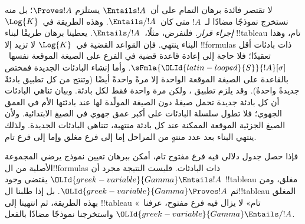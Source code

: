 \documentclass[../../../include/open-logic-section]{subfiles}
\begin{document}
      

\begin{explain}
  لا تقتصر فائدة برهان التمام على أن~$\Entails !A$ يستلزم
  $\Proves !A$؛ بل منه نستخرج نموذجًا مضادًا لـ~$!A$
  متى كان~$\Entails/ !A$. وهذه الطريقة في~$\Log{K}$ \emph{إجراء قرار}.
  فلنفرض، مثلًا،~$\Entails/ !A$. يعطينا برهان
   طريقًا لبناء !!{tableau} تام،
  وهذا البناء ينتهي. فإن القواعد القضية في~$\Log{K}$ لا تزيد إلا
  !!{formula}s ذات بادئات أقل تعقيدًا؛ فلا حاجة إلى إعادة قاعدة
  قضية في الفرع على الصيغة الموقعة نفسها~$\sFmla{\OLId{latin-looped}{S}}{!A}[\sigma]$.
  وأما إنشاء البادئات الجديدة فمختص بالقاعدة
  على الصيغة الموقعة الواحدة إلا مرةً واحدةً أيضًا (وتنتج من كل تطبيق
  بادئةٌ جديدةٌ واحدةٌ).
  وقد يلزم تطبيق
  ، ولكن مرة واحدة
  فقط لكل بادئة. وبيان تناهي البادئات أن كل بادئة جديدة تحمل صيغةً دون
  الصيغة المولّدة لها عند بادئتها الأم في العمق الجهوي؛ فلا تطول سلسلة
  البادئات على أكبر عمق جهوي في الصيغ الابتدائية. ولأن الصيغ الجزئية
  الموقعة الممكنة عند كل بادئة منتهية، تتناهى البادئات الجديدة. ولذلك
  ينتهي البناء بعد عدد منتهٍ من المراحل إما إلى فرع مغلق وإما إلى فرع تام.

  فإذا حصل جدول دلالي فيه فرع مفتوح تام، أمكن ببرهان
   تعيين نموذج يرضي المجموعة
  الأصلية من ال!!{formula}s ذات البادئات. فليست النتيجة مجرد أن
  $\OLId{greek-variable}{Gamma} \Entails !A$ يقتضي وجود !!{tableau} مغلق، ومن ثم
  $\OLId{greek-variable}{Gamma} \Proves !A$. بل إذا طلبنا ال!!{tableau} المغلق بهذه
  الطريقة، ثم انتهينا إلى !!{tableau} «تام» لا يزال فيه فرع مفتوح،
  عرفنا~$\OLId{greek-variable}{Gamma} \Entails/ !A$ واستخرجنا نموذجًا مضادًا بالفعل.
\end{explain}
\end{document}
